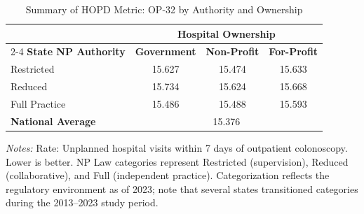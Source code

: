 \begin{table}[htbp]
    \centering
    \caption{Summary of HOPD Metric: OP-32 by Authority and Ownership}
    \label{tab:hopd_op_32}
    \vspace{0.2cm}
    \begin{tabular}{lccc}
        \toprule
        & \multicolumn{3}{c}{\textbf{Hospital Ownership}} \\
        \cmidrule(lr){2-4}
        \textbf{State NP Authority} & \textbf{Government} & \textbf{Non-Profit} & \textbf{For-Profit} \\
        \midrule
        Restricted & 15.627 & 15.474 & 15.633 \\
        Reduced & 15.734 & 15.624 & 15.668 \\
        Full Practice & 15.486 & 15.488 & 15.593 \\
        \midrule
        \textbf{National Average} & \multicolumn{3}{c}{15.376} \\
        \bottomrule
    \end{tabular}
    \vspace{0.1cm}
    \begin{minipage}{0.85\textwidth}
        \footnotesize \textit{Notes:} Rate: Unplanned hospital visits within 7 days of outpatient colonoscopy. Lower is better. NP Law categories represent Restricted (supervision), Reduced (collaborative), and Full (independent practice). Categorization reflects the regulatory environment as of 2023; note that several states transitioned categories during the 2013--2023 study period.
    \end{minipage}
\end{table}